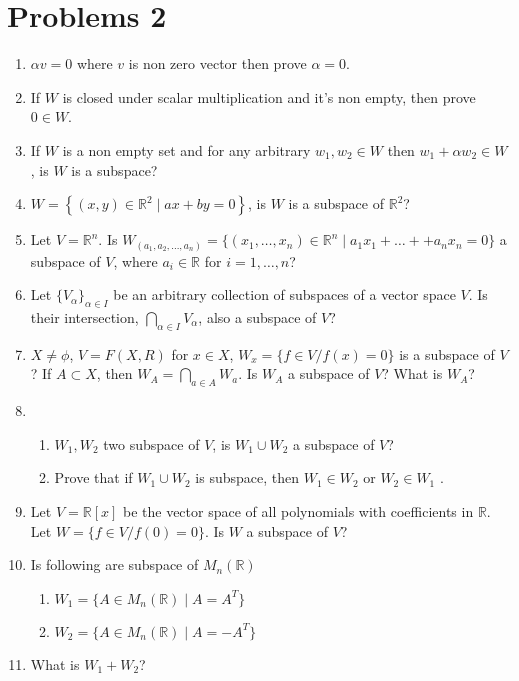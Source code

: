 \documentclass{article}
\begin{document}
\newpage

\section*{Problems 2}
\begin{enumerate} %
\item $\alpha v=0$ where $v$ is non zero vector then prove $\alpha=0$.
\item If $W$ is closed under scalar multiplication and it's non empty, then prove $0\in W$.
\item If $W$ is a non empty set and for any arbitrary $w_1,w_2 \in W$ then $w_1+\alpha w_2 \in W$, is $W$ is a subspace?

\item $W=\left\{ (x,y) \in \mathbb{R}^2 \mid ax+by=0  \right\}$, is $W$ is a subspace of $ \mathbb{R}^2$?
\item Let $V = \mathbb{R}^n$. Is $W_{(a_1, a_2,...,a_n) }= \{(x_1, \dots, x_n) \in \mathbb{R}^n \mid a_1x_1 + \dots + + a_nx_n = 0\}$ a subspace of $V$, where $a_i \in \mathbb{R}$ for $i=1, \dots, n$?
\item Let $\{V_\alpha\}_{\alpha \in I}$ be an arbitrary collection of subspaces of a vector space $V$. Is their intersection, $\bigcap_{\alpha \in I} V_\alpha$, also a subspace of $V$?
\item 
$X \neq\phi$, $V = F(X, R)$ for $x \in X$, $W_x = \{f \in V / f(x) = 0\}$ is a subspace of $V$? If $A \subset X$, then $W_A = \bigcap_{a \in A} W_a$. Is $W_A$ a subspace of $V$? What is $W_A$?
\item \begin{enumerate}
        \item $W_1,W_2 $ two subspace of $V$, is $W_1\cup W_2 $ a subspace of $V$?
        \item Prove that if $W_1\cup W_2 $ is subspace, then $W_1 \in W_2$ or  $W_2\in W_1$ . 
        \end{enumerate}
\item Let $V = \mathbb{R}[x]$ be the vector space of all polynomials with coefficients in $\mathbb{R}$. Let $W=\{f \in V / f(0) = 0\}$. Is $W$ a subspace of $V$?
\item Is following are subspace of $ M_n(\mathbb{R})$ 
\begin{enumerate}
         \item $W_1 = \{A \in M_n(\mathbb{R}) \mid A = A^T\}$
    \item $W_2 = \{A \in M_n(\mathbb{R}) \mid A = -A^T\}$
    \end{enumerate}
    \item What is $W_1+W_2$?
    \end{enumerate}
\newpage
\end{document}
